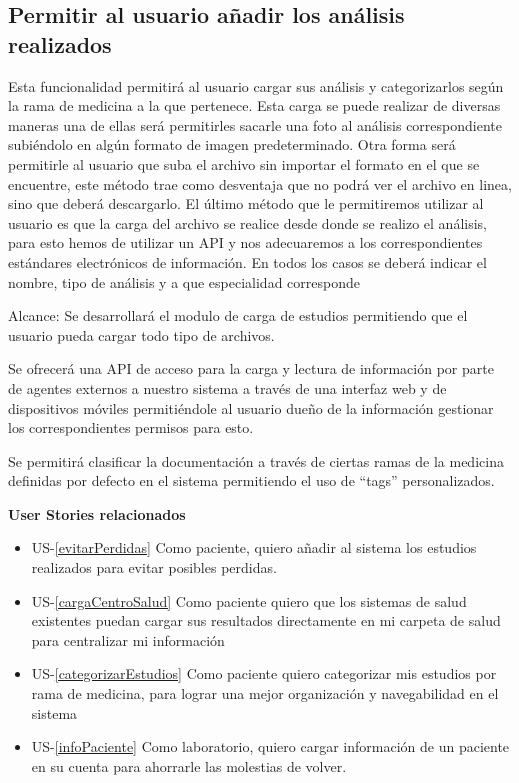 \subsection{Permitir al usuario añadir los análisis realizados}

    Esta funcionalidad permitirá al usuario cargar sus análisis y categorizarlos según la rama de medicina a la que pertenece. Esta carga se puede realizar de diversas maneras una de ellas será permitirles sacarle una foto al análisis correspondiente subiéndolo en algún formato de imagen predeterminado.  Otra forma será permitirle al usuario que suba el archivo sin importar el formato en el que se encuentre, este método trae como desventaja que no podrá ver el archivo en linea, sino que deberá descargarlo. El último método que le permitiremos utilizar al usuario es que la carga del archivo se realice desde donde se realizo el análisis, para esto hemos de utilizar un API y nos adecuaremos a los correspondientes estándares electrónicos de información.
    En todos los casos se deberá  indicar el nombre, tipo de análisis y a que especialidad corresponde 
    
    Alcance: Se desarrollará el modulo de carga de estudios permitiendo que el usuario pueda cargar todo tipo de archivos. 
    
    Se ofrecerá una API de acceso para la carga y lectura de información por parte de agentes externos a nuestro sistema a través de una interfaz web y de dispositivos móviles permitiéndole al usuario dueño de la información gestionar los correspondientes permisos para esto.
    
    Se permitirá clasificar la documentación a través de ciertas ramas de la medicina definidas por defecto en el sistema permitiendo el uso de ``tags'' personalizados.
    
    	\textbf{User Stories relacionados}
	    \begin{itemize} 
	    	\item US-\ref{evitarPerdidas} Como paciente, quiero  añadir al sistema los estudios realizados para evitar posibles perdidas. 
		    \item US-\ref{cargaCentroSalud}  Como paciente quiero que los sistemas de salud existentes puedan cargar sus resultados directamente en mi carpeta de salud para centralizar mi información
			\item  US-\ref{categorizarEstudios} Como paciente quiero categorizar mis estudios por rama de medicina, para lograr una mejor organización y navegabilidad en el sistema
			\item US-\ref{infoPaciente} Como laboratorio, quiero cargar información de un paciente en su cuenta para ahorrarle las molestias de volver.
    	\end{itemize}
    

